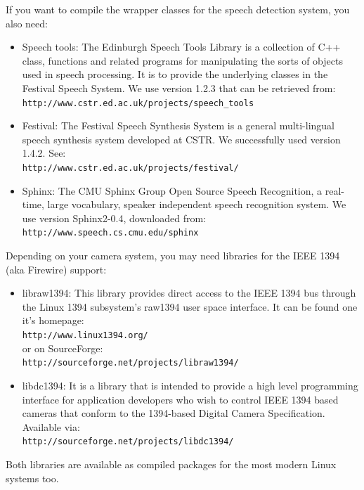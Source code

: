 \documentclass[10pt]{book}
\begin{document}
If you want to compile the wrapper classes for the speech detection
system, you also need:
\begin{itemize}
\item Speech tools: The Edinburgh Speech Tools Library is a collection
  of C++ class, functions and related programs for manipulating the
  sorts of objects used in speech processing. It is to provide the
  underlying classes in the Festival Speech System. We use version
  1.2.3 that can be retrieved from:\\
  \texttt{http://www.cstr.ed.ac.uk/projects/speech\_tools}
\item Festival: The Festival Speech Synthesis System is a general
  multi-lingual speech synthesis system developed at CSTR. We
  successfully used version 1.4.2. See:\\
  \texttt{http://www.cstr.ed.ac.uk/projects/festival/}
\item Sphinx: The CMU Sphinx Group Open Source Speech Recognition, a
  real-time, large vocabulary, speaker independent speech recognition
  system. We use version Sphinx2-0.4, downloaded from:\\
 \texttt{http://www.speech.cs.cmu.edu/sphinx}
\end{itemize}

Depending on your camera system, you may need libraries for the
IEEE 1394 (aka Firewire) support:
\begin{itemize} 
\item libraw1394: This library provides direct access to the IEEE 1394
  bus through the Linux 1394 subsystem's raw1394 user space
  interface. It can be found one it's homepage:\\
  \texttt{http://www.linux1394.org/}\\
  or on SourceForge:\\
  \texttt{http://sourceforge.net/projects/libraw1394/}
\item libdc1394: It is a library that is intended to provide a high
  level programming interface for application developers who wish to
  control IEEE 1394 based cameras that conform to the 1394-based
  Digital Camera Specification. Available via:\\
  \texttt{http://sourceforge.net/projects/libdc1394/}
\end{itemize}
Both libraries are available as compiled packages for the most modern
Linux systems too.
\end{document}
